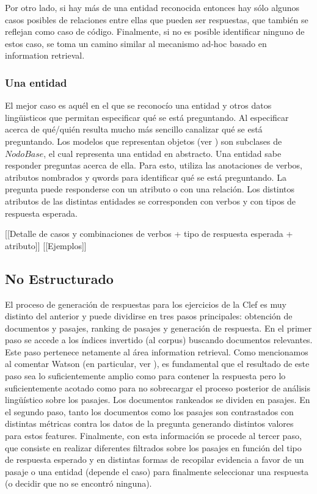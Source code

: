 Por otro lado, si hay más de una entidad reconocida entonces hay sólo algunos casos posibles de relaciones entre ellas que pueden ser respuestas, que también se reflejan como caso de código. Finalmente, si no es posible identificar ninguno de estos caso, se toma un camino similar al mecanismo ad-hoc basado en information retrieval.


\subsubsection*{Una entidad}
El mejor caso es aquél en el que se reconocío una entidad y otros datos lingüisticos que permitan especificar qué se está preguntando. Al especificar acerca de qué/quién resulta mucho más sencillo canalizar qué se está preguntando. Los modelos que representan objetos (ver ) son subclases de $NodoBase$, el cual representa una entidad en abstracto. Una entidad sabe responder preguntas acerca de ella. Para esto, utiliza las anotaciones de verbos, atributos nombrados y qwords para identificar qué se está preguntando. La pregunta puede responderse con un atributo o con una relación. Los distintos atributos de las distintas entidades se corresponden con verbos y con tipos de respuesta esperada. 

[[Detalle de casos y combinaciones de verbos + tipo de respuesta esperada + atributo]]
[[Ejemplos]]

\subsection{No Estructurado}

El proceso de generación de respuestas para los ejercicios de la Clef es muy distinto del anterior y puede dividirse en tres pasos principales: obtención de documentos y pasajes, ranking de pasajes y generación de respuesta. En el primer paso se accede a los índices invertido (al corpus) buscando documentos relevantes. Este paso pertenece netamente al área information retrieval. Como mencionamos al comentar Watson (en particular, ver ), es fundamental que el resultado de este paso sea lo suficientemente amplio como para contener la respuesta pero lo suficientemente acotado como para no sobrecargar el proceso posterior de análisis lingüístico sobre los pasajes. Los documentos rankeados se dividen en pasajes. En el segundo paso, tanto los documentos como los pasajes son contrastados con distintas métricas contra los datos de la pregunta generando distintos valores para estos features. Finalmente, con esta información se procede al tercer paso, que consiste en realizar diferentes filtrados sobre los pasajes en función del tipo de respuesta esperado y en distintas formas de recopilar evidencia a favor de un pasaje o una entidad (depende el caso) para finalmente seleccionar una respuesta (o decidir que no se encontró ninguna).

